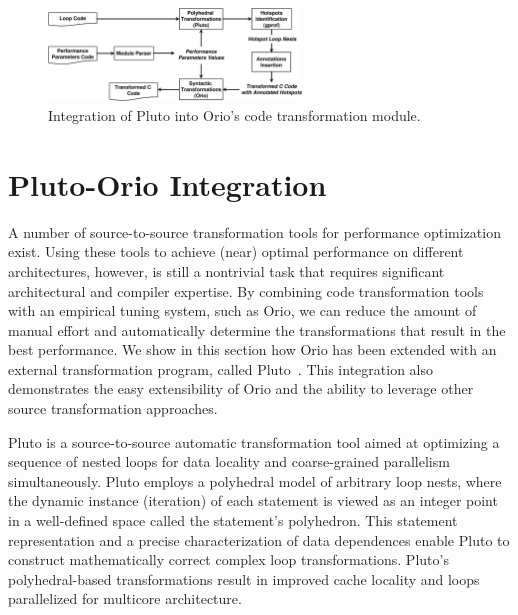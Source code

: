 
\begin{figure}[bt]
\begin{center}
\includegraphics[width=0.6\textwidth]{figures/pluto-orio.eps}    
\end{center}   
\caption{Integration of Pluto into Orio's code transformation module.}
\label{fig:pluto-orio}
\end{figure}  

\section{Pluto-Orio Integration}
\label{sec:integration}

A number of source-to-source transformation tools for performance
optimization exist. Using these tools to achieve (near) optimal performance
on different architectures, however, is still a nontrivial task that requires
significant architectural and compiler expertise. By combining code
transformation tools with an empirical tuning system, such as Orio, we can
reduce the amount of manual effort and automatically determine the
transformations that result in the best performance. We show in this section
how Orio has been extended with an external transformation program, called
Pluto~\cite{uday08pldi}. This integration also demonstrates the easy
extensibility of Orio and the ability to leverage other source transformation
approaches.

Pluto is a source-to-source automatic transformation tool aimed at optimizing
a sequence of nested loops for data locality and coarse-grained parallelism
simultaneously. Pluto employs a polyhedral model of arbitrary loop nests,
where the dynamic instance (iteration) of each statement is viewed as an
integer point in a well-defined space called the statement's polyhedron. This
statement representation and a precise characterization of data dependences
enable Pluto to construct mathematically correct complex loop
transformations. Pluto's polyhedral-based transformations result in improved
cache locality and loops parallelized for multicore architecture.

